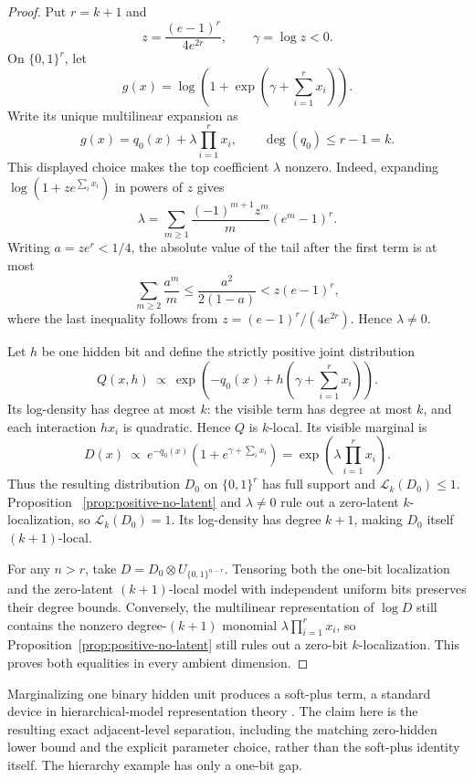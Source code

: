 \documentclass{article}
\newcommand{\LC}{\mathcal{L}}
\newcommand{\bits}{\{0,1\}}
\begin{document}
\begin{proof}
Put $r=k+1$ and
\[
  z=\frac{(e-1)^r}{4e^{2r}},
  \qquad \gamma=\log z<0.
\]
On $\bits^r$, let
\[
  g(x)=\log\!\left(1+\exp\!\left(\gamma+\sum_{i=1}^r x_i\right)\right).
\]
Write its unique multilinear expansion as
\[
  g(x)=q_0(x)+\lambda\prod_{i=1}^r x_i,
  \qquad \deg(q_0)\le r-1=k.
\]
This displayed choice makes the top coefficient $\lambda$ nonzero.  Indeed,
expanding $\log(1+z e^{\sum_i x_i})$ in powers of $z$ gives
\[
  \lambda
  =\sum_{m\ge1}\frac{(-1)^{m+1}z^m}{m}(e^m-1)^r.
\]
Writing $a=ze^r<1/4$, the absolute value of the tail after the first term is
at most
\[
  \sum_{m\ge2}\frac{a^m}{m}
  \le \frac{a^2}{2(1-a)}
  < z(e-1)^r,
\]
where the last inequality follows from
$z=(e-1)^r/(4e^{2r})$.  Hence $\lambda\ne0$.

Let $h$ be one hidden bit and define the strictly positive joint distribution
\[
  Q(x,h)\ \propto\
  \exp\!\left(-q_0(x)+h\left(\gamma+\sum_{i=1}^r x_i\right)\right).
\]
Its log-density has degree at most $k$: the visible term has degree at most
$k$, and each interaction $hx_i$ is quadratic.  Hence $Q$ is $k$-local.  Its
visible marginal is
\[
  D(x)\ \propto\
  e^{-q_0(x)}\left(1+e^{\gamma+\sum_i x_i}\right)
  =\exp\!\left(\lambda\prod_{i=1}^r x_i\right).
\]
Thus the resulting distribution $D_0$ on $\bits^r$ has full support and
$\LC_k(D_0)\le1$.  Proposition
~\ref{prop:positive-no-latent} and $\lambda\ne0$ rule out a zero-latent
$k$-localization, so $\LC_k(D_0)=1$.  Its log-density has degree $k+1$, making
$D_0$ itself $(k+1)$-local.

For any $n>r$, take $D=D_0\otimes U_{\bits^{n-r}}$.  Tensoring both the
one-bit localization and the zero-latent $(k+1)$-local model with independent
uniform bits preserves their degree bounds.  Conversely, the multilinear
representation of $\log D$ still contains the nonzero degree-$(k+1)$ monomial
$\lambda\prod_{i=1}^r x_i$, so Proposition~\ref{prop:positive-no-latent}
still rules out a zero-bit $k$-localization.  This proves both equalities in
every ambient dimension.
\end{proof}

Marginalizing one binary hidden unit produces a soft-plus term, a standard
device in hierarchical-model representation theory \cite{montufarrauh17}.
The claim here is the resulting exact adjacent-level separation, including the
matching zero-hidden lower bound and the explicit parameter choice, rather
than the soft-plus identity itself.  The hierarchy example has only a one-bit
gap.
\end{document}
